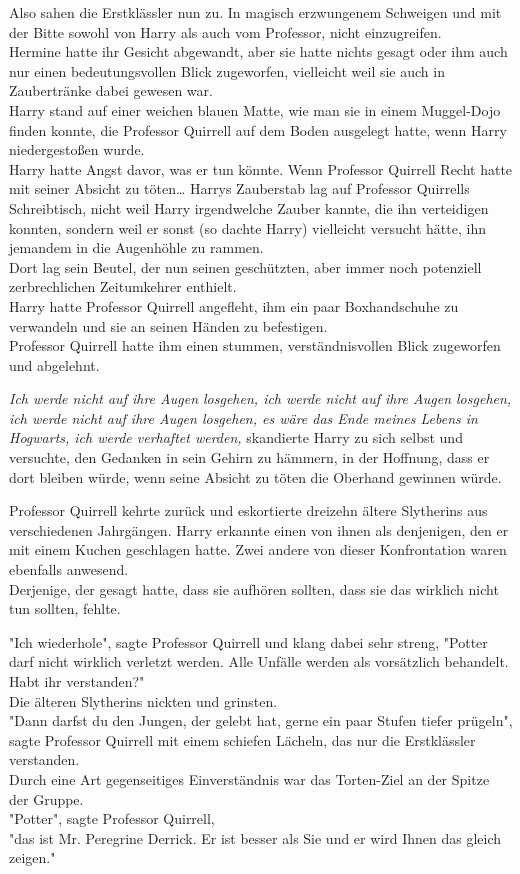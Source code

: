 {Also sahen die Erstklässler nun zu. In magisch erzwungenem Schweigen und mit der Bitte sowohl von Harry als auch vom Professor, nicht einzugreifen.\\ Hermine hatte ihr Gesicht abgewandt, aber sie hatte nichts gesagt oder ihm auch nur einen bedeutungsvollen Blick zugeworfen, vielleicht weil sie auch in Zaubertränke dabei gewesen war.\\ Harry stand auf einer weichen blauen Matte, wie man sie in einem Muggel-Dojo finden konnte, die Professor Quirrell auf dem Boden ausgelegt hatte, wenn Harry niedergestoßen wurde.\\ Harry hatte Angst davor, was er tun könnte. Wenn Professor Quirrell Recht hatte mit seiner Absicht zu töten… Harrys Zauberstab lag auf Professor Quirrells Schreibtisch, nicht weil Harry irgendwelche Zauber kannte, die ihn verteidigen konnten, sondern weil er sonst (so dachte Harry) vielleicht versucht hätte, ihn jemandem in die Augenhöhle zu rammen.\\ Dort lag sein Beutel, der nun seinen geschützten, aber immer noch potenziell zerbrechlichen Zeitumkehrer enthielt.\\ Harry hatte Professor Quirrell angefleht, ihm ein paar Boxhandschuhe zu verwandeln und sie an seinen Händen zu befestigen.\\ Professor Quirrell hatte ihm einen stummen, verständnisvollen Blick zugeworfen und abgelehnt.

\emph{Ich werde nicht auf ihre Augen losgehen, ich werde nicht auf ihre Augen losgehen, ich werde nicht auf ihre Augen losgehen, es wäre das Ende meines Lebens in Hogwarts, ich werde verhaftet werden,} skandierte Harry zu sich selbst und versuchte, den Gedanken in sein Gehirn zu hämmern, in der Hoffnung, dass er dort bleiben würde, wenn seine Absicht zu töten die Oberhand gewinnen würde.

Professor Quirrell kehrte zurück und eskortierte dreizehn ältere Slytherins aus verschiedenen Jahrgängen. Harry erkannte einen von ihnen als denjenigen, den er mit einem Kuchen geschlagen hatte. Zwei andere von dieser Konfrontation waren ebenfalls anwesend.\\ Derjenige, der gesagt hatte, dass sie aufhören sollten, dass sie das wirklich nicht tun sollten, fehlte.

"Ich wiederhole", sagte Professor Quirrell und klang dabei sehr streng, "Potter darf nicht wirklich verletzt werden. Alle Unfälle werden als vorsätzlich behandelt. Habt ihr verstanden?"\\ Die älteren Slytherins nickten und grinsten.\\ "Dann darfst du den Jungen, der gelebt hat, gerne ein paar Stufen tiefer prügeln", sagte Professor Quirrell mit einem schiefen Lächeln, das nur die Erstklässler verstanden.\\ Durch eine Art gegenseitiges Einverständnis war das Torten-Ziel an der Spitze der Gruppe.\\ "Potter", sagte Professor Quirrell,\\ "das ist Mr. Peregrine Derrick. Er ist besser als Sie und er wird Ihnen das gleich zeigen."

}
